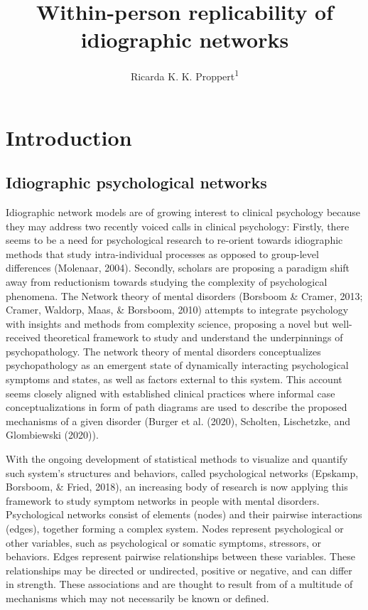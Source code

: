 \documentclass[
  english,
  man]{apa6}
\title{Within-person replicability of idiographic networks}
\author{Ricarda K. K. Proppert\textsuperscript{1}}
\date{}
\affiliation{\vspace{0.5cm}\textsuperscript{1} Clinical Psychology, Leiden University, The Netherlands}
\begin{document}
\maketitle

\hypertarget{introduction}{%
\section{Introduction}\label{introduction}}

\hypertarget{idiographic-psychological-networks}{%
\subsection{Idiographic psychological networks}\label{idiographic-psychological-networks}}

Idiographic network models are of growing interest to clinical psychology because they may address two recently voiced calls in clinical psychology: Firstly, there seems to be a need for psychological research to re-orient towards idiographic methods that study intra-individual processes as opposed to group-level differences (Molenaar, 2004). Secondly, scholars are proposing a paradigm shift away from reductionism towards studying the complexity of psychological phenomena. The Network theory of mental disorders (Borsboom \& Cramer, 2013; Cramer, Waldorp, Maas, \& Borsboom, 2010) attempts to integrate psychology with insights and methods from complexity science, proposing a novel but well-received theoretical framework to study and understand the underpinnings of psychopathology. The network theory of mental disorders conceptualizes psychopathology as an emergent state of dynamically interacting psychological symptoms and states, as well as factors external to this system. This account seems closely aligned with established clinical practices where informal case conceptualizations in form of path diagrams are used to describe the proposed mechanisms of a given disorder (Burger et al. (2020), Scholten, Lischetzke, and Glombiewski (2020)).

With the ongoing development of statistical methods to visualize and quantify such system's structures and behaviors, called psychological networks (Epskamp, Borsboom, \& Fried, 2018), an increasing body of research is now applying this framework to study symptom networks in people with mental disorders. Psychological networks consist of elements (nodes) and their pairwise interactions (edges), together forming a complex system. Nodes represent psychological or other variables, such as psychological or somatic symptoms, stressors, or behaviors. Edges represent pairwise relationships between these variables. These relationships may be directed or undirected, positive or negative, and can differ in strength. These associations and are thought to result from of a multitude of mechanisms which may not necessarily be known or defined.
\end{document}
